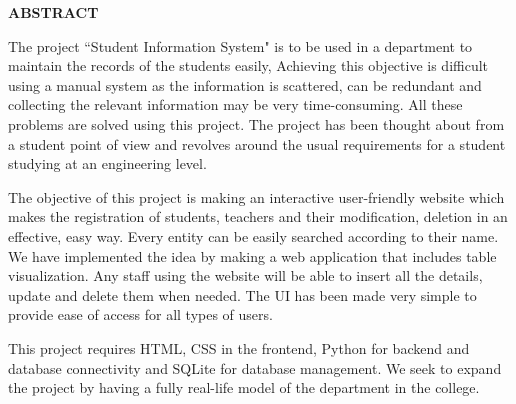 \pagestyle{empty}
\begin{center}
\textup{\Large{\textbf{ABSTRACT}}}
\end{center}

\justify
\indent
The project ``Student Information System" is to be used in a department to maintain the records of the students easily, Achieving this objective is difficult using a manual system as the information is scattered, can be redundant and collecting the relevant information may be very time-consuming. All these problems are solved using this project. The project has been thought about from a student point of view and revolves around the usual requirements for a student studying at an engineering level. 

The objective of this project is making an interactive user-friendly website which makes the registration of students, teachers and their modification, deletion in an effective, easy way. Every entity can be easily searched according to their name. We have implemented the idea by making a web application that includes table visualization. Any staff using the website will be able to insert all the details, update and delete them when needed. The UI has been made very simple to provide ease of access for all types of users.

This project requires HTML, CSS in the frontend, Python for backend and database connectivity and SQLite for database management. We seek to expand the project by having a fully real-life model of the department in the college. 

\pagebreak
